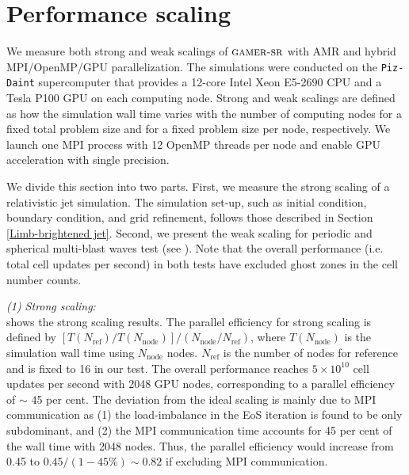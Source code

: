 \chapter{Performance scaling}
\label{c:performance-scaling}
We measure both strong and weak scalings of $\textsc{gamer-sr}$ with AMR and hybrid MPI/OpenMP/GPU
parallelization. The simulations were conducted on the \texttt{Piz-Daint} supercomputer that provides a 12-core Intel Xeon E5-2690 CPU and a Tesla P100 GPU on each computing node. Strong and weak scalings are defined as how the simulation wall time varies with the number of computing nodes for a fixed total problem size and for a fixed problem size per node, respectively. We launch one MPI process with 12 OpenMP threads per node and enable GPU acceleration with single precision.

We divide this section into two parts. First, we measure the strong scaling of a relativistic jet simulation. The simulation set-up, such as initial condition, boundary condition, and grid refinement, follows those described in Section \ref{Limb-brightened jet}. Second, we present the weak scaling for periodic and spherical multi-blast waves test (see ). Note that the overall performance (i.e. total cell updates per second) in both tests have excluded ghost zones in the cell number counts.


    \emph{(1) Strong scaling:}\\
     shows the strong scaling results. The parallel efficiency for strong scaling is defined by $\left[T\left(N_{\text{ref}}\right)/T\left(N_{\text{node}}\right)\right]/\left(N_{\text{node}}/N_{\text{ref}}\right)$, where  $T(N_{\text{node}})$ is the simulation wall time using $N_{\text{node}}$ nodes. $N_{\text{ref}}$ is the number of nodes for reference and is fixed to 16 in our test. The overall performance reaches $5\times 10^{10}$ cell updates per second with 2048 GPU nodes, corresponding to a parallel efficiency of $\sim$ 45 per cent. The deviation from the ideal scaling is mainly due to MPI communication as (1) the load-imbalance in the EoS iteration is found to be only subdominant, and (2) the MPI communication time accounts for 45 per cent of the wall time with 2048 nodes. Thus, the parallel efficiency would increase from 0.45 to $0.45/(1-45\%)\sim 0.82$ if excluding MPI communication.


